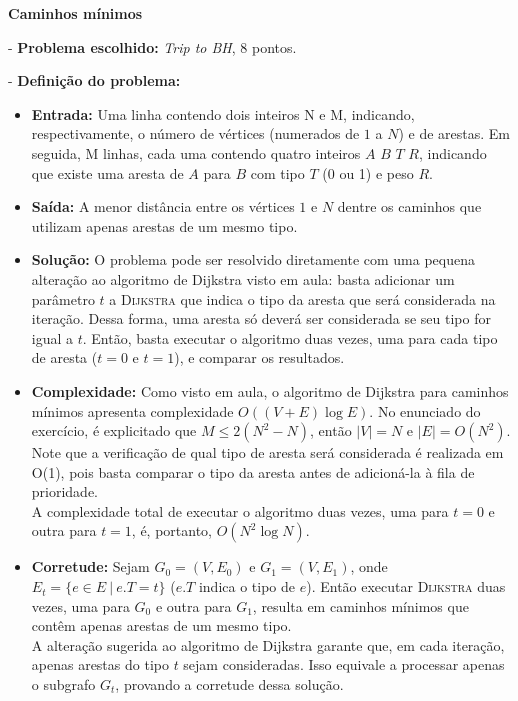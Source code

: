 \documentclass[
    12pt,
    a4paper,
    brazil,
    english
]{article}
\begin{document}
\textbf{\large Caminhos mínimos}
\vspace{0.5cm}

- \textbf{Problema escolhido:} \textit{Trip to BH}, 8 pontos.

\vspace{0.25cm}

- \textbf{Definição do problema:}
\begin{itemize}
    \item \textbf{Entrada:} Uma linha contendo dois inteiros N e M, indicando, respectivamente, o número de 
    vértices (numerados de $1$ a $N$) e de arestas. Em seguida, M linhas, cada uma contendo quatro inteiros $A$ $B$ $T$ $R$, indicando que 
    existe uma aresta de $A$ para $B$ com tipo $T$ (0 ou 1) e peso $R$.
    \item \textbf{Saída:} A menor distância entre os vértices $1$ e $N$ dentre os caminhos que utilizam apenas arestas de um mesmo tipo.
    \item \textbf{Solução:} O problema pode ser resolvido diretamente com uma pequena alteração ao algoritmo de Dijkstra visto em aula: basta adicionar um parâmetro $t$ a \textsc{Dijkstra} que indica o tipo da aresta que será considerada na iteração.
    Dessa forma, uma aresta só deverá ser considerada se seu tipo for igual a $t$. Então, basta executar o algoritmo duas vezes, uma para cada tipo de aresta ($t = 0$ e $t = 1$), e comparar os resultados.
    \item \textbf{Complexidade:} Como visto em aula, o algoritmo de Dijkstra para caminhos mínimos apresenta complexidade $O((V + E) \log E)$. No enunciado do exercício, 
    é explicitado que $M \leq 2(N^2 - N)$, então $|V| = N$ e $|E| = O(N^2)$. \\
    Note que a verificação de qual tipo de aresta será considerada é realizada em O(1), pois basta comparar o tipo da aresta antes de adicioná-la à fila de prioridade. \\
    A complexidade total de executar o algoritmo duas vezes, uma para $t = 0$ e outra para $t = 1$, é, portanto, $O(N^2 \log N)$.
    \item \textbf{Corretude:} Sejam $G_0 = (V, E_0)$ e $G_1 = (V, E_1)$, onde $E_t = \{e \in E\ |\ e.T=t\}$ ($e.T$ indica o tipo de $e$).
    Então executar \textsc{Dijkstra} duas vezes, uma para $G_0$ e outra para $G_1$, resulta em caminhos mínimos que contêm apenas arestas de um mesmo tipo. \\
    A alteração sugerida ao algoritmo de Dijkstra garante que, em cada iteração, apenas arestas do tipo $t$ sejam consideradas. Isso equivale a processar apenas o subgrafo $G_t$, provando a corretude dessa solução.\\
\end{itemize}
\end{document}
